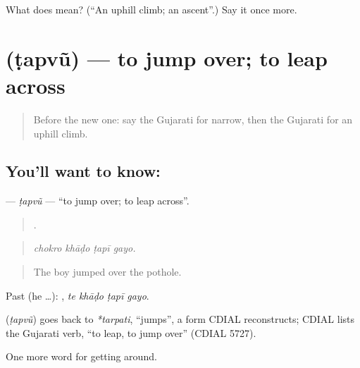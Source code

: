 \begin{tcolorbox}[breakable,colback=teal!4,colframe=teal!35!black,title={Before you move on}]
What does  mean? (\textquotedblleft{}An uphill climb; an ascent\textquotedblright{}.) Say it once more.
\end{tcolorbox}
\section[\texorpdfstring{\gu{ટપવું} (ṭapvũ)}{ટપવું (ṭapvũ)}]{ (ṭapvũ) — to jump over; to leap across}

\label{lesson:GU-C404-tapvu-leap}



\begin{quote}
Before the new one: say the Gujarati for narrow, then the Gujarati for an uphill climb.
\end{quote}

\subsection*{You'll want to know: }
\textbf{} — \emph{ṭapvũ} — \textquotedblleft{}to jump over; to leap across\textquotedblright{}.

\begin{quote}
   .
\end{quote}

\begin{quote}
\emph{chokro khāḍo ṭapī gayo.}
\end{quote}

\begin{quote}
The boy jumped over the pothole.
\end{quote}

Past (he …):    , \emph{te khāḍo ṭapī gayo}.

\begin{cousinweb}
\textbf{} (\emph{ṭapvũ}) goes back to \emph{*tarpati}, \textquotedblleft{}jumps\textquotedblright{}, a form CDIAL reconstructs; CDIAL lists the Gujarati verb, \textquotedblleft{}to leap, to jump over\textquotedblright{} (CDIAL 5727).
\end{cousinweb}

\begin{grammarlens}[title={What you've built}]
One more word for getting around.
\end{grammarlens}

